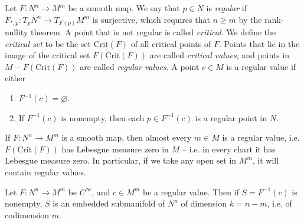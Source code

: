\begin{defn}
Let $F: N^n \to M^m$ be a smooth map. We say that
$p \in N$ is \emph{regular} if
$F_{\ast, p}: T_pN^n \to T_{F(p)}M^m$ is surjective, which requires
that $n \geq m$ by the rank-nullity theorem. A point that is not
regular is called \emph{critical}. We define the \emph{critical set}
to be the set $\mathrm{Crit}(F)$ of all critical points of $F$. Points
that lie in the image of the critical set $F(\mathrm{Crit}(F))$ are
called \emph{critical values}, and points in
$M - F(\mathrm{Crit}(F))$ are called \emph{regular values}.
A point $c \in M$ is a regular value if either
\begin{enumerate}
  \item{$F^{-1}(c) = \varnothing$.}
  \item{
    If $F^{-1}(c)$ is nonempty, then each $p \in F^{-1}(c)$ is a
    regular point in $N$.
  }
\end{enumerate}
\end{defn}

\begin{theorem}
If $F: N^n \to M^m$ is a smooth map, then almost every $m \in M$ is a
regular value, i.e. $F(\mathrm{Crit}(F))$ has Lebesgue measure zero in
$M$ -- i.e. in every chart it has Lebesgue measure zero.
In particular, if we take any open set in $M^m$, it will contain
regular values.
\end{theorem}

\begin{theorem}
Let $F: N^n \to M^m$ be $C^\infty$, and $c \in M^m$ be a regular
value. Then if $S = F^{-1}(c)$ is nonempty, $S$ is an embedded
submanifold of $N^n$ of dimension $k = n - m$, i.e. of codimension $m$.
\end{theorem}

